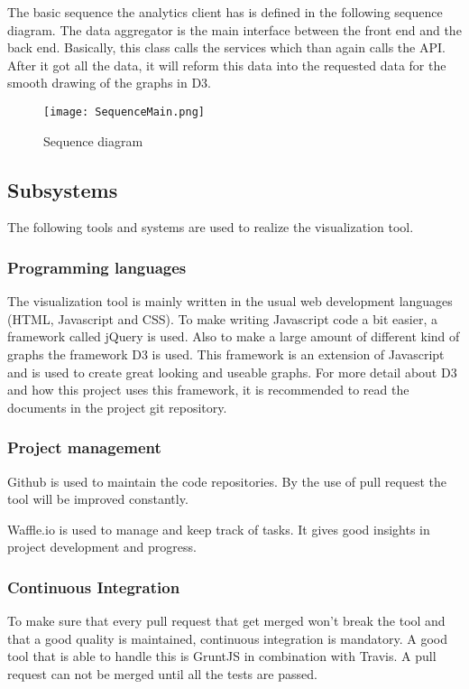 \documentclass{article}
\begin{document}
The basic sequence the analytics client has is defined in the following sequence diagram. The data aggregator is the main interface between the front end and the back end. Basically, this class calls the services which than again calls the API. After it got all the data, it will reform this data into the requested data for the smooth drawing of the graphs in D3.

\begin{figure}[htp]
\centering
\texttt{[image: SequenceMain.png]}
\caption{Sequence diagram}
\end{figure}

\subsection{Subsystems}

The following tools and systems are used to realize the visualization tool.

\subsubsection{Programming languages}

The visualization tool is mainly written in the usual web development languages (HTML, Javascript and CSS). To make writing Javascript code a bit easier, a framework called jQuery is used. Also to make a large amount of different kind of graphs the framework D3 is used. This framework is an extension of Javascript and is used to create great looking and useable graphs. For more detail about D3 and how this project uses this framework, it is recommended to read the documents in the project git repository.

\subsubsection{Project management}

Github is used to maintain the code repositories. By the use of pull request the tool will be improved constantly.

Waffle.io is used to manage and keep track of tasks. It gives good insights in project development and progress.

\subsubsection{Continuous Integration}

To make sure that every pull request that get merged won't break the tool and that a good quality is maintained, continuous integration is mandatory. A good tool that is able to handle this is GruntJS in combination with Travis. A pull request can not be merged until all the tests are passed.
\end{document}
